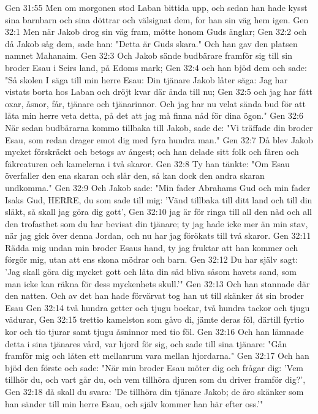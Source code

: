 Gen 31:55  Men om morgonen stod Laban bittida upp, och sedan han hade kysst sina barnbarn och sina döttrar och välsignat dem, for han sin väg hem igen.
Gen 32:1  Men när Jakob drog sin väg fram, mötte honom Guds änglar;
Gen 32:2  och då Jakob såg dem, sade han: "Detta är Guds skara." Och han gav den platsen namnet Mahanaim.
Gen 32:3  Och Jakob sände budbärare framför sig till sin broder Esau i Seirs land, på Edoms mark;
Gen 32:4  och han bjöd dem och sade: "Så skolen I säga till min herre Esau: Din tjänare Jakob låter säga: Jag har vistats borta hos Laban och dröjt kvar där ända till nu;
Gen 32:5  och jag har fått oxar, åsnor, får, tjänare och tjänarinnor. Och jag har nu velat sända bud för att låta min herre veta detta, på det att jag må finna nåd för dina ögon."
Gen 32:6  När sedan budbärarna kommo tillbaka till Jakob, sade de: "Vi träffade din broder Esau, som redan drager emot dig med fyra hundra man."
Gen 32:7  Då blev Jakob mycket förskräckt och betogs av ångest; och han delade sitt folk och fåren och fäkreaturen och kamelerna i två skaror.
Gen 32:8  Ty han tänkte: "Om Esau överfaller den ena skaran och slår den, så kan dock den andra skaran undkomma."
Gen 32:9  Och Jakob sade: "Min fader Abrahams Gud och min fader Isaks Gud, HERRE, du som sade till mig: 'Vänd tillbaka till ditt land och till din släkt, så skall jag göra dig gott',
Gen 32:10  jag är för ringa till all den nåd och all den trofasthet som du har bevisat din tjänare; ty jag hade icke mer än min stav, när jag gick över denna Jordan, och nu har jag förökats till två skaror.
Gen 32:11  Rädda mig undan min broder Esaus hand, ty jag fruktar att han kommer och förgör mig, utan att ens skona mödrar och barn.
Gen 32:12  Du har själv sagt: 'Jag skall göra dig mycket gott och låta din säd bliva såsom havets sand, som man icke kan räkna för dess myckenhets skull.'"
Gen 32:13  Och han stannade där den natten. Och av det han hade förvärvat tog han ut till skänker åt sin broder Esau
Gen 32:14  två hundra getter och tjugu bockar, två hundra tackor och tjugu vädurar,
Gen 32:15  trettio kamelston som gåvo di, jämte deras föl, därtill fyrtio kor och tio tjurar samt tjugu åsninnor med tio föl.
Gen 32:16  Och han lämnade detta i sina tjänares vård, var hjord för sig, och sade till sina tjänare: "Gån framför mig och låten ett mellanrum vara mellan hjordarna."
Gen 32:17  Och han bjöd den förste och sade: "När min broder Esau möter dig och frågar dig: 'Vem tillhör du, och vart går du, och vem tillhöra djuren som du driver framför dig?',
Gen 32:18  då skall du svara: 'De tillhöra din tjänare Jakob; de äro skänker som han sänder till min herre Esau, och själv kommer han här efter oss.'"
